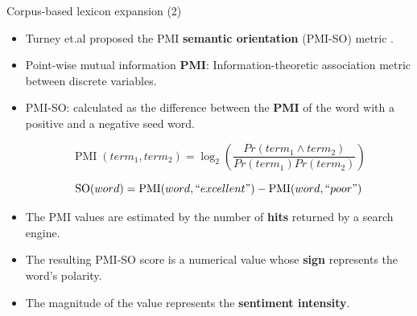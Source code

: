 \begin{frame}{Corpus-based lexicon expansion (2)}
\begin{scriptsize}
\begin{itemize}
\item Turney et.al proposed the PMI \textbf{semantic orientation} (PMI-SO) metric \cite{turney2003measuring}.
\item Point-wise mutual information \textbf{PMI}: Information-theoretic association metric between discrete variables.
\item PMI-SO: calculated as the difference between the \textbf{PMI} of the word with a positive and a negative seed word.

\begin{equation}
 \operatorname{PMI}(term_{1}, term_{2})= \log_{2} \left ( \frac{Pr(term_{1} \wedge term_{2})}{Pr(term_{1})Pr(term_{2})} \right )
\end{equation}

\begin{equation}\label{eq:so}
 \operatorname{SO}(word) = \operatorname{PMI}(word, ``excellent") - \operatorname{PMI}(word, ``poor")
\end{equation}

\item The PMI values are estimated by the number of \textbf{hits} returned by a search engine.

\item The resulting PMI-SO score is a numerical value whose \textbf{sign} represents the word's polarity.

\item The magnitude of the value represents the \textbf{sentiment intensity}. 


\end{itemize}
\end{scriptsize}
\end{frame}




